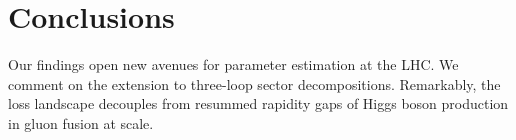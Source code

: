 \section{Conclusions}\label{sec:conclusions}

Our findings open new avenues for parameter estimation at the LHC. We
comment on the extension to three-loop sector decompositions.
Remarkably, the loss landscape decouples from resummed rapidity gaps of
Higgs boson production in gluon fusion at scale.

